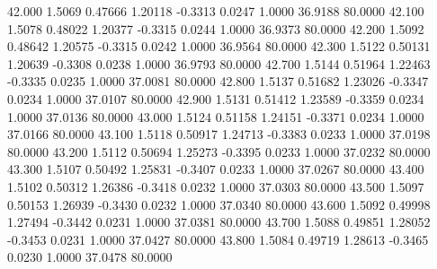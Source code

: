   42.000   1.5069   0.47666   1.20118  -0.3313   0.0247   1.0000  36.9188  80.0000
  42.100   1.5078   0.48022   1.20377  -0.3315   0.0244   1.0000  36.9373  80.0000
  42.200   1.5092   0.48642   1.20575  -0.3315   0.0242   1.0000  36.9564  80.0000
  42.300   1.5122   0.50131   1.20639  -0.3308   0.0238   1.0000  36.9793  80.0000
  42.700   1.5144   0.51964   1.22463  -0.3335   0.0235   1.0000  37.0081  80.0000
  42.800   1.5137   0.51682   1.23026  -0.3347   0.0234   1.0000  37.0107  80.0000
  42.900   1.5131   0.51412   1.23589  -0.3359   0.0234   1.0000  37.0136  80.0000
  43.000   1.5124   0.51158   1.24151  -0.3371   0.0234   1.0000  37.0166  80.0000
  43.100   1.5118   0.50917   1.24713  -0.3383   0.0233   1.0000  37.0198  80.0000
  43.200   1.5112   0.50694   1.25273  -0.3395   0.0233   1.0000  37.0232  80.0000
  43.300   1.5107   0.50492   1.25831  -0.3407   0.0233   1.0000  37.0267  80.0000
  43.400   1.5102   0.50312   1.26386  -0.3418   0.0232   1.0000  37.0303  80.0000
  43.500   1.5097   0.50153   1.26939  -0.3430   0.0232   1.0000  37.0340  80.0000
  43.600   1.5092   0.49998   1.27494  -0.3442   0.0231   1.0000  37.0381  80.0000
  43.700   1.5088   0.49851   1.28052  -0.3453   0.0231   1.0000  37.0427  80.0000
  43.800   1.5084   0.49719   1.28613  -0.3465   0.0230   1.0000  37.0478  80.0000

